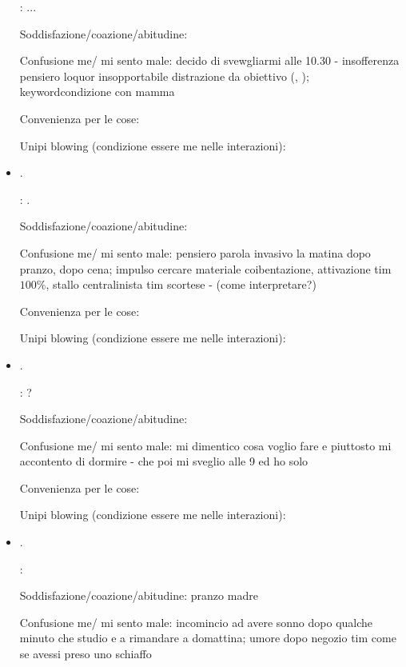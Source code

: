\begin{itemize}
: ...

Soddisfazione/coazione/abitudine: 

Confusione me/ mi sento male:  decido di svewgliarmi alle 10.30 -  insofferenza pensiero loquor insopportabile distrazione da obiettivo (, ); keyword{condizione con mamma} 

Convenienza per le cose:

Unipi blowing (condizione essere me nelle interazioni):

\item {}.

: .

Soddisfazione/coazione/abitudine: 

Confusione me/ mi sento male: pensiero parola invasivo la matina dopo pranzo, dopo cena;  impulso cercare materiale coibentazione, attivazione tim $100\%$, stallo centralinista tim scortese -  (come interpretare?)

Convenienza per le cose:

Unipi blowing (condizione essere me nelle interazioni):

\item {}.

: ?

Soddisfazione/coazione/abitudine: 

Confusione me/ mi sento male: mi dimentico cosa voglio fare e piuttosto mi accontento di dormire - che poi mi sveglio alle 9 ed ho solo 

Convenienza per le cose:

Unipi blowing (condizione essere me nelle interazioni):

\item {}.

:

Soddisfazione/coazione/abitudine: pranzo madre 

Confusione me/ mi sento male: incomincio ad avere sonno dopo qualche minuto che studio e a rimandare a domattina; umore dopo negozio tim come se avessi preso uno schiaffo


\end{itemize}
